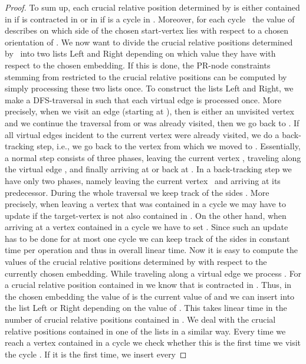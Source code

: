 \documentclass{scrartcl}
\newcommand{\1}[1]{{\normalfont \ensuremath{#1^{\tiny\circled{1}}}}} \newcommand{\2}[1]{{\normalfont \ensuremath{#1^{\tiny\circled{2}}}}} \renewcommand{\k}[1]{{\normalfont \ensuremath{#1^{\tiny\circled{k}}}}} \newcommand{\proj}[2]{\ensuremath{\left.#1\right|_{#2}}} \newcommand{\eps}{\varepsilon}
\theoremstyle{plain} \newtheorem{theorem}{Theorem} \newcounter{lemmacounter} \setcounter{lemmacounter}{0} \newtheorem{lemma}[lemmacounter]{Lemma} \newtheorem{fact}{Fact}  \newtheorem{corollary}{Corollary} \theoremstyle{definition} \newtheorem{definition}{Definition}
\begin{document}
\begin{proof}
  To sum up, each crucial relative position  determined by
   is either contained in  if  is contracted in
   or in  if  is a cycle in .
  Moreover, for each cycle~ the value of  describes on
  which side of  the chosen start-vertex  lies with respect to
  a chosen orientation of .  We now want to divide the
  crucial relative positions determined by~ into two lists {\sc
    Left} and {\sc Right} depending on which value they have with
  respect to the chosen embedding.  If this is done, the PR-node
  constraints stemming from  restricted to the crucial relative
  positions can be computed by simply processing these two lists once.
  To construct the lists {\sc Left} and {\sc Right}, we make a
  DFS-traversal in  such that each virtual edge is
  processed once.  More precisely, when we visit an edge 
  (starting at ), then  is either an unvisited vertex and we
  continue the traversal from  or  was already visited, then we
  go back to .  If all virtual edges incident to the current vertex
   were already visited, we do a back-tracking step, i.e., we go
  back to the vertex from which we moved to .  Essentially, a
  normal step consists of three phases, leaving the current vertex
  , traveling along the virtual edge , and finally
  arriving at  or back at .  In a back-tracking step we have
  only two phases, namely leaving the current vertex~ and arriving
  at its predecessor.  During the whole traversal we keep track of the
  sides .  More precisely, when leaving a vertex 
  that was contained in a cycle  we may have to update 
  if the target-vertex  is not also contained in .  On the other
  hand, when arriving at a vertex  contained in a cycle  we have
  to set .  Since such an update has to be
  done for at most one cycle we can keep track of the sides in
  constant time per operation and thus in overall linear time.  Now it
  is easy to compute the values of the crucial relative positions
  determined by  with respect to the currently chosen embedding.
  While traveling along a virtual edge  we process
  .  For a crucial relative position 
  contained in  we know that  is contracted in
  .  Thus, in the chosen embedding the value of  is
  the current value of  and we can insert  into
  the list {\sc Left} or {\sc Right} depending on the value of
  .  This takes linear time in the number of crucial
  relative positions contained in .  We deal with the
  crucial relative positions contained in one of the lists
   in a similar way.  Every time we reach a vertex 
  contained in a cycle  we check whether this is the first time we
  visit the cycle .  If it is the first time, we insert every

\end{proof}
\end{document}
